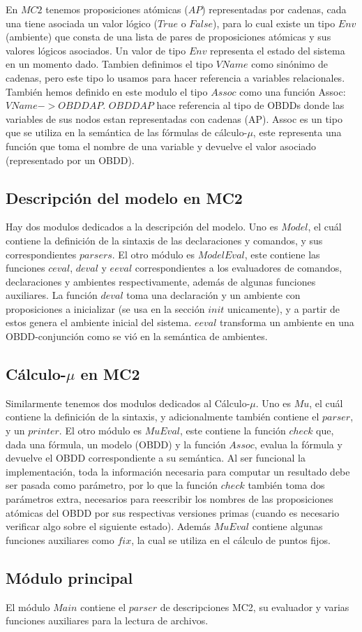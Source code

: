 En $MC2$ tenemos proposiciones atómicas ($AP$) representadas por cadenas, cada una tiene asociada un valor lógico ($True$ o $False$), para lo cual existe un tipo $Env$ (ambiente) que consta de una lista de pares de proposiciones atómicas y sus valores lógicos asociados. Un valor de tipo $Env$ representa el estado del sistema en un momento dado. Tambien definimos el tipo $VName$ como sinónimo de cadenas, pero este tipo lo usamos para hacer referencia a variables relacionales. También hemos definido en este modulo el tipo $Assoc$ como una función Assoc: $VName -> OBDD AP$. $OBDD AP$ hace referencia al tipo de OBDDs donde las variables de sus nodos estan representadas con cadenas (AP). Assoc es un tipo que se utiliza en la semántica de las fórmulas de cálculo-$\mu$, este representa una función que toma el nombre de una variable y devuelve el valor asociado (representado por un OBDD).

\subsection{Descripción del modelo en MC2}

Hay dos modulos dedicados a la descripción del modelo. Uno es $Model$, el cuál contiene la definición de la sintaxis de las declaraciones y comandos, y  sus correspondientes $parsers$. El otro módulo es $ModelEval$, este contiene las funciones $ceval$, $deval$ y $eeval$ correspondientes a los evaluadores de comandos, declaraciones y ambientes respectivamente, además de algunas funciones auxiliares. La función $deval$ toma una declaración y un ambiente con proposiciones a inicializar (se usa en la sección $init$ unicamente), y a partir de estos genera el ambiente inicial del sistema. $eeval$ transforma un ambiente en una OBDD-conjunción como se vió en la semántica de ambientes.

\subsection{Cálculo-$\mu$ en MC2}

Similarmente tenemos dos modulos dedicados al Cálculo-$\mu$. Uno es $Mu$, el cuál contiene la definición de la sintaxis, y adicionalmente también contiene el $parser$, y un $printer$. El otro módulo es $MuEval$, este contiene la función $check$ que, dada una fórmula, un modelo (OBDD) y la función $Assoc$, evalua la fórmula y devuelve el OBDD correspondiente a su semántica. Al ser funcional la implementación, toda la información necesaria para computar un resultado debe ser pasada como parámetro, por lo que la función $check$ también toma dos parámetros extra, necesarios para reescribir los nombres de las proposiciones atómicas del OBDD por sus respectivas versiones primas (cuando es necesario verificar algo sobre el siguiente estado). Además $MuEval$ contiene algunas funciones auxiliares como $fix$, la cual se utiliza en el cálculo de puntos fijos.

\subsection{Módulo principal}

El módulo $Main$ contiene el $parser$ de descripciones MC2, su evaluador y varias funciones auxiliares para la lectura de archivos.